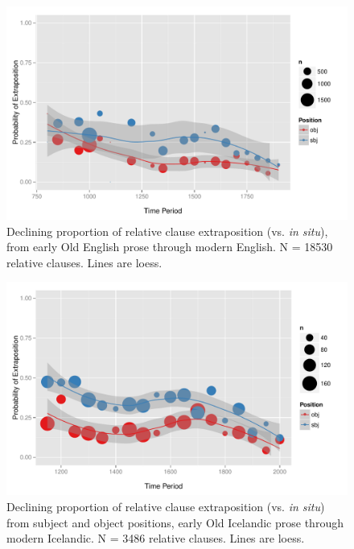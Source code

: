 
\begin{figure}

  \includegraphics[width=1.1\textwidth]{stableVarTalks/exSbjObjYearBinned50Loessymeb.pdf}
\caption{Declining proportion of relative clause extraposition (vs. \textsl{in situ}), from early Old English prose through modern English. N = 18530 relative clauses. Lines are loess.}
\label{engfig}       %
\end{figure}

\begin{figure}

  \includegraphics[width=1.1\textwidth]{stableVarTalks/exSbjObjYearBinned50Loessice.pdf}
\caption{Declining proportion of relative clause extraposition (vs. \textsl{in situ}) from subject and object positions, early Old Icelandic prose through modern Icelandic. N = 3486 relative clauses. Lines are loess.}
\label{icefig}       
\end{figure}

